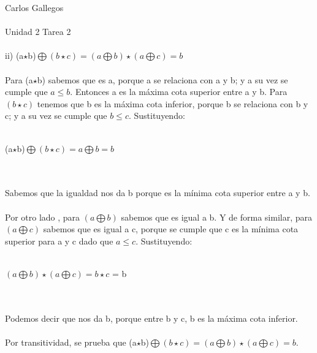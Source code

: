 \documentclass[a4paper,10pt]{article}
\title{}
\author{}
\date{}
\begin{document}
\maketitle
Carlos Gallegos\\\\
Unidad 2 Tarea 2\\\\
ii) (a$\star$b)$\bigoplus(b\star c) = (a\bigoplus b) \star (a\bigoplus c) = b$\\\\
Para (a$\star$b) sabemos que es a, porque a se relaciona con a y b; y a su vez se cumple que $a\leq b$. Entonces a es la máxima cota superior entre a y b. Para $(b\star c)$ tenemos que b es la máxima cota inferior, porque b se relaciona con b y c; y a su vez se cumple que $b\leq c$. Sustituyendo:\\\\
\centerline{(a$\star$b)$\bigoplus(b\star c) = a \bigoplus b = b$}\\\\
Sabemos que la igualdad nos da b porque es la mínima cota superior entre a y b.\\\\
Por otro lado , para $(a\bigoplus b)$ sabemos que es igual a b. Y de forma similar, para $(a\bigoplus c)$ sabemos que es igual a c, porque se cumple que c es la mínima cota superior para a y c dado que $a\leq c$. Sustituyendo:\\\\
\centerline{$(a\bigoplus b) \star (a\bigoplus c) = b \star c$ = b}\\\\
Podemos decir que nos da b, porque entre b y c, b es la máxima cota inferior.\\\\
Por transitividad, se prueba que (a$\star$b)$\bigoplus(b\star c) = (a\bigoplus b) \star (a\bigoplus c) = b$.
\end{document}

